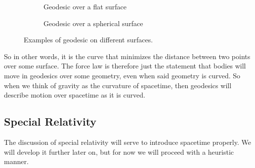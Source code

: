 \documentclass{article}
\begin{document}
 		\begin{figure}[h]
 			\begin{subfigure}{0.46\textwidth}
 				\center
 			\vspace{0.5cm}
 			\caption{Geodesic over a flat surface}
 			\end{subfigure}
 			\begin{subfigure}{0.46\textwidth}
 				\center
 				\caption{Geodesic over a spherical surface}
 			\end{subfigure}
 			\caption{Examples of geodesic on different surfaces.}
 		\end{figure}
 		So in other words, it is the curve that minimizes the distance between two points over some surface. The force law is therefore just the statement that bodies will move in geodesics over some geometry, even when said geometry is curved. So when we think of gravity as the curvature of spacetime, then geodesics will describe motion over spacetime as it is curved.
 		
 		\subsection{Special Relativity}
 		The discussion of special relativity will serve to introduce spacetime properly. We will develop it further later on, but for now we will proceed with a heuristic manner. 
 		
\end{document}
